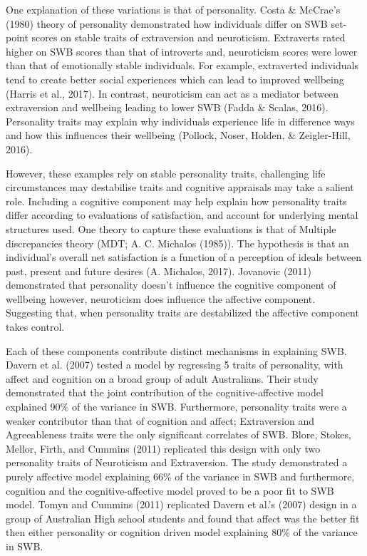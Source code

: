 \documentclass[man,floatsintext]{apa6}
\theoremstyle{definition}
\theoremstyle{definition}
\theoremstyle{definition}
\theoremstyle{remark}
\begin{document}
One explanation of these variations is that of personality. Costa \&
McCrae's (1980) theory of personality demonstrated how individuals
differ on SWB set-point scores on stable traits of extraversion and
neuroticism. Extraverts rated higher on SWB scores than that of
introverts and, neuroticism scores were lower than that of emotionally
stable individuals. For example, extraverted individuals tend to create
better social experiences which can lead to improved wellbeing (Harris
et al., 2017). In contrast, neuroticism can act as a mediator between
extraversion and wellbeing leading to lower SWB (Fadda \& Scalas, 2016).
Personality traits may explain why individuals experience life in
difference ways and how this influences their wellbeing (Pollock, Noser,
Holden, \& Zeigler-Hill, 2016).

However, these examples rely on stable personality traits, challenging
life circumstances may destabilise traits and cognitive appraisals may
take a salient role. Including a cognitive component may help explain
how personality traits differ according to evaluations of satisfaction,
and account for underlying mental structures used. One theory to capture
these evaluations is that of Multiple discrepancies theory (MDT; A. C.
Michalos (1985)). The hypothesis is that an individual's overall net
satisfaction is a function of a perception of ideals between past,
present and future desires (A. Michalos, 2017). Jovanovic (2011)
demonstrated that personality doesn't influence the cognitive component
of wellbeing however, neuroticism does influence the affective
component. Suggesting that, when personality traits are destabilized the
affective component takes control.

Each of these components contribute distinct mechanisms in explaining
SWB. Davern et al. (2007) tested a model by regressing 5 traits of
personality, with affect and cognition on a broad group of adult
Australians. Their study demonstrated that the joint contribution of the
cognitive-affective model explained 90\% of the variance in SWB.
Furthermore, personality traits were a weaker contributor than that of
cognition and affect; Extraversion and Agreeableness traits were the
only significant correlates of SWB. Blore, Stokes, Mellor, Firth, and
Cummins (2011) replicated this design with only two personality traits
of Neuroticism and Extraversion. The study demonstrated a purely
affective model explaining 66\% of the variance in SWB and furthermore,
cognition and the cognitive-affective model proved to be a poor fit to
SWB model. Tomyn and Cummins (2011) replicated Davern et al.'s (2007)
design in a group of Australian High school students and found that
affect was the better fit then either personality or cognition driven
model explaining 80\% of the variance in SWB.
\end{document}
